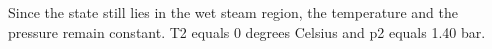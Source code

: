 Since the state still lies in the wet steam region, the temperature and the pressure remain constant. T2 equals 0 degrees Celsius and p2 equals 1.40 bar.